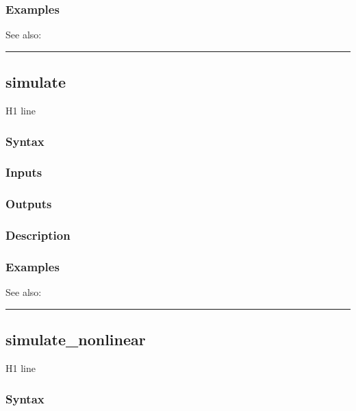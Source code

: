 \documentclass[letterpaper,10pt,english]{sphinxmanual}
\begin{document}
\subsubsection{Examples}
\label{classes/models/@dsge/dsge:id162}
See also:


\bigskip\hrule{}\bigskip



\subsection{simulate}
\label{classes/models/@dsge/dsge:id163}\label{classes/models/@dsge/dsge:simulate}
H1 line


\subsubsection{Syntax}
\label{classes/models/@dsge/dsge:id164}

\subsubsection{Inputs}
\label{classes/models/@dsge/dsge:id165}

\subsubsection{Outputs}
\label{classes/models/@dsge/dsge:id166}

\subsubsection{Description}
\label{classes/models/@dsge/dsge:id167}

\subsubsection{Examples}
\label{classes/models/@dsge/dsge:id168}
See also:


\bigskip\hrule{}\bigskip



\subsection{simulate\_nonlinear}
\label{classes/models/@dsge/dsge:id169}\label{classes/models/@dsge/dsge:simulate-nonlinear}
H1 line


\subsubsection{Syntax}
\label{classes/models/@dsge/dsge:id170}
\end{document}

